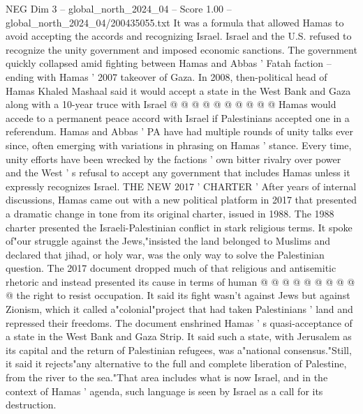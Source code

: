\begin{textsample}{NEG Dim 3 – global\_north\_2024\_04 – Score 1.00 – global\_north\_2024\_04/200435055.txt}
It was a formula that allowed Hamas to avoid accepting the accords and recognizing Israel.
Israel and the U.S. refused to recognize the unity government and imposed economic sanctions.
The government quickly collapsed amid fighting between Hamas and Abbas ' Fatah faction -- ending with Hamas ' 2007 takeover of Gaza.
In 2008, then-political head of Hamas Khaled Mashaal said it would accept a state in the West Bank and Gaza along with a 10-year truce with Israel @ @ @ @ @ @ @ @ @ @ Hamas would accede to a permanent peace accord with Israel if Palestinians accepted one in a referendum.
Hamas and Abbas ' PA have had multiple rounds of unity talks ever since, often emerging with variations in phrasing on Hamas ' stance.
Every time, unity efforts have been wrecked by the factions ' own bitter rivalry over power and the West ' s refusal to accept any government that includes Hamas unless it expressly recognizes Israel.
THE NEW 2017 ' CHARTER ' After years of internal discussions, Hamas came out with a new political platform in 2017 that presented a dramatic change in tone from its original charter, issued in 1988.
The 1988 charter presented the Israeli-Palestinian conflict in stark religious terms.
It spoke of"our struggle against the Jews,"insisted the land belonged to Muslims and declared that jihad, or holy war, was the only way to solve the Palestinian question.
The 2017 document dropped much of that religious and antisemitic rhetoric and instead presented its cause in terms of human @ @ @ @ @ @ @ @ @ @ the right to resist occupation.
It said its fight wasn't against Jews but against Zionism, which it called a"colonial"project that had taken Palestinians ' land and repressed their freedoms.
The document enshrined Hamas ' s quasi-acceptance of a state in the West Bank and Gaza Strip.
It said such a state, with Jerusalem as its capital and the return of Palestinian refugees, was a"national consensus."Still, it said it rejects"any alternative to the full and complete liberation of Palestine, from the river to the sea."That area includes what is now Israel, and in the context of Hamas ' agenda, such language is seen by Israel as a call for its destruction.

\end{textsample}
